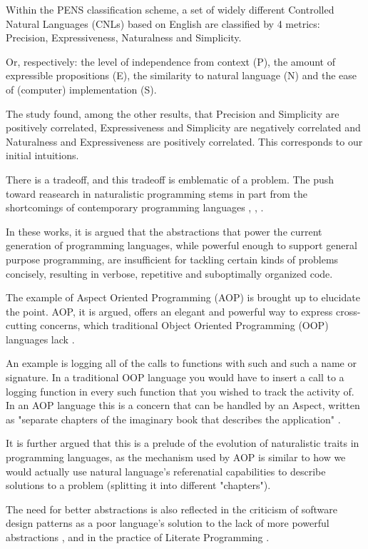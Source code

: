 Within the PENS classification scheme, a set of widely different Controlled Natural Languages (CNLs) based on English are classified by 4 metrics: Precision, Expressiveness, Naturalness and Simplicity.

Or, respectively: the level of independence from context (P), the amount of expressible propositions (E), the similarity to natural language (N) and the ease of (computer) implementation (S).

The study found, among the other results, that Precision and Simplicity are positively correlated, Expressiveness and Simplicity are negatively correlated and Naturalness and Expressiveness are positively correlated. This corresponds to our initial intuitions.

There is a tradeoff, and this tradeoff is emblematic of a problem. The push toward reasearch in naturalistic programming stems in part from the shortcomings of contemporary programming languages \cite{knoll2006pegasus}, \cite{lopes2003beyond}, \cite{pulido2017survey}.

In these works, it is argued that the abstractions that power the current generation of programming languages, while powerful enough to support general purpose programming, are insufficient for tackling certain kinds of problems concisely, resulting in verbose, repetitive and suboptimally organized code.

The example of Aspect Oriented Programming (AOP) is brought up to elucidate the point. AOP, it is argued, offers an elegant and powerful way to express cross-cutting concerns, which traditional Object Oriented Programming (OOP) languages lack \cite{lopes2003beyond}.

An example is logging all of the calls to functions with such and such a name or signature. In a traditional OOP language you would have to insert a call to a logging function in every such function that you wished to track the activity of. In an AOP language this is a concern that can be handled by an Aspect, written as "separate chapters of the imaginary book that describes the application" \cite{lopes2003beyond}.

It is further argued that this is a prelude of the evolution of naturalistic traits in programming languages, as the mechanism used by AOP is similar to how we would actually use natural language's referenatial capabilities to describe solutions to a problem (splitting it into different "chapters").

The need for better abstractions is also reflected in the criticism of software design patterns as a poor language's solution to the lack of more powerful abstractions \cite{revengenerds}, and in the practice of Literate Programming \cite{knuth1984literate}.

